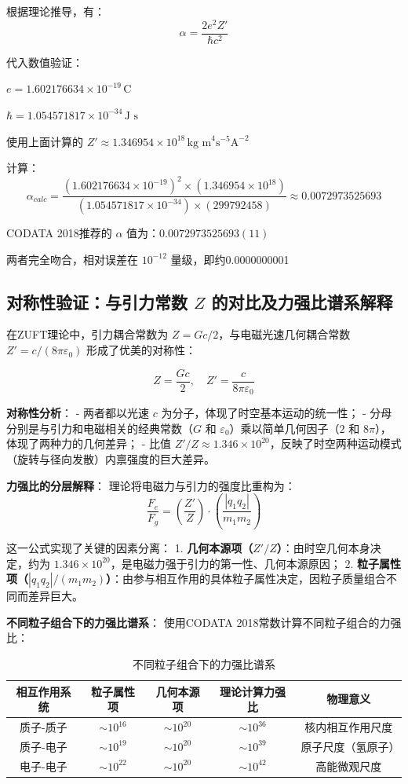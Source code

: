 \documentclass[a4paper,12pt]{article}
\theoremstyle{plain}
\begin{document}
根据理论推导，有：
$$\alpha = \frac{2e^2 Z'}{\hbar c^2}$$ 

代入数值验证：

$e = 1.602176634 \times 10^{-19} \, \text{C}$

$\hbar = 1.054571817 \times 10^{-34} \, \text{J s}$

使用上面计算的 $Z' \approx 1.346954 \times 10^{18} \, \text{kg m}^4 \text{s}^{-5} \text{A}^{-2}$

计算：
$$\alpha_{calc} = \frac{(1.602176634 \times 10^{-19})^2 \times (1.346954 \times 10^{18})}{(1.054571817 \times 10^{-34}) \times (299792458)} \approx 0.0072973525693$$ 

CODATA 2018推荐的 $\alpha$ 值为：$0.0072973525693(11)$

两者完全吻合，相对误差在 $10^{-12}$ 量级，即约0.0000000001%

\subsection{对称性验证：与引力常数 $Z$ 的对比及力强比谱系解释}
在ZUFT理论中，引力耦合常数为 $Z = G c / 2$，与电磁光速几何耦合常数 $Z' = c/(8\pi\varepsilon_0)$ 形成了优美的对称性：

$$Z = \frac{G c}{2}, \quad Z' = \frac{c}{8\pi\varepsilon_0}$$ 

\textbf{对称性分析}：
- 两者都以光速 $c$ 为分子，体现了时空基本运动的统一性；
- 分母分别是与引力和电磁相关的经典常数（$G$ 和 $\varepsilon_0$）乘以简单几何因子（$2$ 和 $8\pi$），体现了两种力的几何差异；
- 比值 $Z'/Z \approx 1.346\times10^{20}$，反映了时空两种运动模式（旋转与径向发散）内禀强度的巨大差异。

\textbf{力强比的分层解释}：
理论将电磁力与引力的强度比重构为：
$$\frac{F_e}{F_g} = \left( \frac{Z'}{Z} \right) \cdot \left( \frac{|q_1 q_2|}{m_1 m_2} \right)$$ 

这一公式实现了关键的因素分离：
1. \textbf{几何本源项（$Z'/Z$）}：由时空几何本身决定，约为 $1.346\times10^{20}$，是电磁力强于引力的第一性、几何本源原因；
2. \textbf{粒子属性项（$|q_1 q_2|/(m_1 m_2)$）}：由参与相互作用的具体粒子属性决定，因粒子质量组合不同而差异巨大。

\textbf{不同粒子组合下的力强比谱系}：
使用CODATA 2018常数计算不同粒子组合的力强比：

\begin{table}[H]
\centering
\begin{tabular}{|c|c|c|c|c|}
\hline
相互作用系统 & 粒子属性项 & 几何本源项 & 理论计算力强比 & 物理意义 \\ 
\hline
质子-质子 & $\sim10^{16}$ & $\sim10^{20}$ & $\sim10^{36}$ & 核内相互作用尺度 \\ 
\hline
质子-电子 & $\sim10^{19}$ & $\sim10^{20}$ & $\sim10^{39}$ & 原子尺度（氢原子） \\ 
\hline
电子-电子 & $\sim10^{22}$ & $\sim10^{20}$ & $\sim10^{42}$ & 高能微观尺度 \\ 
\hline
\end{tabular}
\caption{不同粒子组合下的力强比谱系}
\label{tab:force_ratios}
\end{table}
\end{document}
